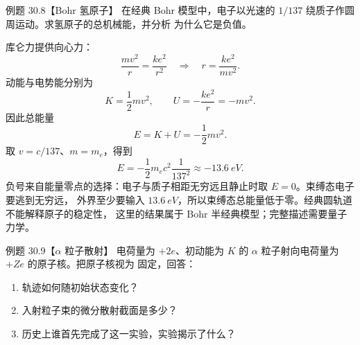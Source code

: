\Needspace{0.34\textheight}
\begin{origexamplebox}{例题 30.8【Bohr 氢原子】}
在经典 Bohr 模型中，电子以光速的 $1/137$ 绕质子作圆周运动。求氢原子的总机械能，并分析
为什么它是负值。
\bohrDiagram
\end{origexamplebox}

\begin{xesolution}
库仑力提供向心力：
\[
  \frac{mv^2}{r}=\frac{ke^2}{r^2}
  \quad\Longrightarrow\quad
  r=\frac{ke^2}{mv^2}.
\]
动能与电势能分别为
\[
  K=\frac12mv^2,
  \qquad
  U=-\frac{ke^2}{r}=-mv^2.
\]
因此总能量
\[
  \boxed{E=K+U=-\frac12mv^2}.
\]
取 $v=c/137$、$m=m_e$，得到
\[
  E=-\frac12m_ec^2\frac1{137^2}
  \approx\boxed{-\SI{13.6}{eV}}.
\]
负号来自能量零点的选择：电子与质子相距无穷远且静止时取 $E=0$。束缚态电子要逃到无穷远，
外界至少要输入 $\SI{13.6}{eV}$，所以束缚态总能量低于零。经典圆轨道不能解释原子的稳定性，
这里的结果属于 Bohr 半经典模型；完整描述需要量子力学。
\end{xesolution}

\Needspace{0.38\textheight}
\begin{origexamplebox}{例题 30.9【$\alpha$ 粒子散射】}
电荷量为 $+2e$、初动能为 $K$ 的 $\alpha$ 粒子射向电荷量为 $+Ze$ 的原子核。把原子核视为
固定，回答：
\begin{enumerate}[label=(\arabic*),leftmargin=2.2em]
  \item 轨迹如何随初始状态变化？
  \item 入射粒子束的微分散射截面是多少？
  \item 历史上谁首先完成了这一实验，实验揭示了什么？
\end{enumerate}
\rutherfordDiagram
\end{origexamplebox}


